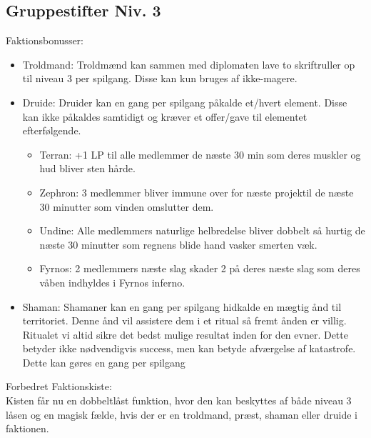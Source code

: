 \subsection*{Gruppestifter Niv. 3}

Faktionsbonusser:
\begin{itemize}
    \item Troldmand: Troldmænd kan sammen med diplomaten lave to skriftruller op til niveau 3 per spilgang. Disse kan kun bruges af ikke-magere.
    \item Druide: Druider kan en gang per spilgang påkalde et/hvert element. Disse kan ikke påkaldes samtidigt og kræver et offer/gave til elementet efterfølgende. 
    \begin{itemize}
        \item Terran: +1 LP til alle medlemmer de næste 30 min som deres muskler og hud bliver sten hårde.
        \item Zephron: 3 medlemmer bliver immune over for næste projektil de næste 30 minutter som vinden omslutter dem.
        \item Undine: Alle medlemmers naturlige helbredelse bliver dobbelt så hurtig de næste 30 minutter som regnens blide hand vasker smerten væk.
        \item Fyrnos: 2 medlemmers næste slag skader 2 på deres næste slag som deres våben indhyldes i Fyrnos inferno.
    \end{itemize}
    \item Shaman: Shamaner kan en gang per spilgang hidkalde en mægtig ånd til territoriet. Denne ånd vil assistere dem i et ritual så fremt ånden er villig. Ritualet vi altid sikre det bedst mulige resultat inden for den evner. Dette betyder ikke nødvendigvis success, men kan betyde afværgelse af katastrofe. Dette kan gøres en gang per spilgang
\end{itemize}

Forbedret Faktionskiste:\\
Kisten får nu en dobbeltlåst funktion, hvor den kan beskyttes af både niveau 3 låsen og en magisk fælde, hvis der er en troldmand, præst, shaman eller druide i faktionen. 






